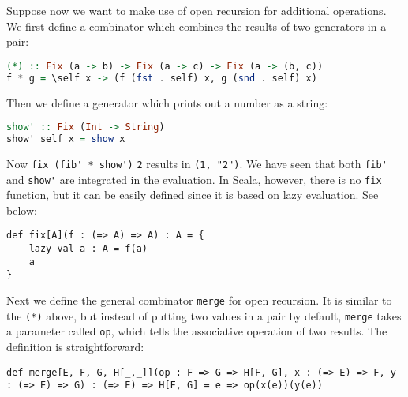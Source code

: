 Suppose now we want to make use of open recursion for additional operations. We first define a combinator which combines the results of two generators in a pair:
\begin{lstlisting}[language=Haskell,keywords={}]
(*) :: Fix (a -> b) -> Fix (a -> c) -> Fix (a -> (b, c))
f * g = \self x -> (f (fst . self) x, g (snd . self) x)
\end{lstlisting}
Then we define a generator which prints out a number as a string:
\begin{lstlisting}[language=Haskell,keywords={}]
show' :: Fix (Int -> String)
show' self x = show x
\end{lstlisting}
Now \lstinline{fix (fib'}\lstinline{ * show')} \lstinline{2} results in \lstinline{(1, "2")}. We have seen that both \lstinline{fib'} and \lstinline{show'} are integrated in the evaluation. In Scala, however, there is no \lstinline{fix} function, but it can be easily defined since it is based on lazy evaluation. See below:
\begin{lstlisting}
def fix[A](f : (=> A) => A) : A = {
    lazy val a : A = f(a)
    a
}
\end{lstlisting}
Next we define the general combinator \lstinline{merge} for open recursion. It is similar to the \lstinline{(*)} above, but instead of putting two values in a pair by default, \lstinline{merge} takes a parameter called \lstinline{op}, which tells the associative operation of two results. The definition is straightforward:
\begin{lstlisting}
def merge[E, F, G, H[_,_]](op : F => G => H[F, G], x : (=> E) => F, y : (=> E) => G) : (=> E) => H[F, G] = e => op(x(e))(y(e))
\end{lstlisting}

